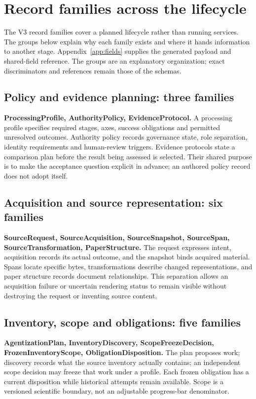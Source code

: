 \section{Record families across the lifecycle}\label{sec:lifecycle}

The \RecordFamilyCount{} V3 record families cover a planned lifecycle rather than \RecordFamilyCount{} running services. The groups below explain why each family exists and where it hands information to another stage. Appendix~\ref{app:fields} supplies the generated payload and shared-field reference. The groups are an explanatory organization; exact discriminators and references remain those of the schemas.

\subsection{Policy and evidence planning: three families}

\textbf{ProcessingProfile, AuthorityPolicy, EvidenceProtocol.} A processing profile specifies required stages, axes, success obligations and permitted unresolved outcomes. Authority policy records governance state, role separation, identity requirements and human-review triggers. Evidence protocols state a comparison plan before the result being assessed is selected. Their shared purpose is to make the acceptance question explicit in advance; an authored policy record does not adopt itself.

\subsection{Acquisition and source representation: six families}

\textbf{SourceRequest, SourceAcquisition, SourceSnapshot, SourceSpan, SourceTransformation, PaperStructure.} The request expresses intent, acquisition records its actual outcome, and the snapshot binds acquired material. Spans locate specific bytes, transformations describe changed representations, and paper structure records document relationships. This separation allows an acquisition failure or uncertain rendering status to remain visible without destroying the request or inventing source content.

\subsection{Inventory, scope and obligations: five families}

\textbf{AgentizationPlan, InventoryDiscovery, ScopeFreezeDecision, FrozenInventoryScope, ObligationDisposition.} The plan proposes work; discovery records what the source inventory actually contains; an independent scope decision may freeze that work under a profile. Each frozen obligation has a current disposition while historical attempts remain available. Scope is a versioned scientific boundary, not an adjustable progress-bar denominator.

